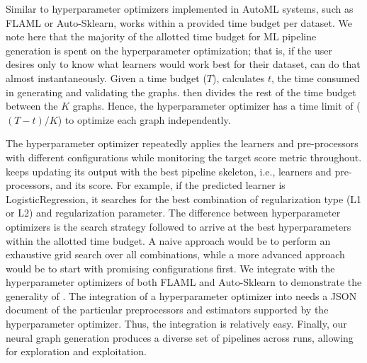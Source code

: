 Similar to hyperparameter optimizers implemented in AutoML systems, such as FLAML or Auto-Sklearn, {\sysname} works within a provided time budget per dataset. We note here that the majority of the allotted time budget for ML pipeline generation is spent on the hyperparameter optimization; that is, if the user desires only to know what learners would work best for their dataset, {\sysname} can do that almost instantaneously. Given a time budget ($T$), {\sysname} calculates $t$, the time consumed in generating and validating the graphs. {\sysname} then divides the rest of the time budget between the $K$ graphs. Hence, the hyperparameter optimizer has a time limit of ($(T-t) / K$) to optimize each graph independently.   

The hyperparameter optimizer repeatedly applies the learners and pre-processors with different configurations while monitoring the target score metric throughout. {\sysname}  keeps updating its output with the best pipeline skeleton, i.e.,  learners and pre-processors, and its score.  
For example, if the predicted learner is LogisticRegression, it searches for the best combination of regularization type (L1 or L2) and regularization parameter. The difference between hyperparameter optimizers is the search strategy followed to arrive at the best hyperparameters within the allotted time budget. A naive approach would be to perform an exhaustive grid search over all combinations, while a more advanced approach would be to start with promising configurations first.  
We integrate {\sysname} with the hyperparameter optimizers of both FLAML \cite{flaml} and Auto-Sklearn \cite{autosklearn} to demonstrate the generality of {\sysname}. The integration of a hyperparameter optimizer into {\sysname} needs a JSON document of the particular preprocessors and estimators supported by the hyperparameter optimizer. Thus, the integration is relatively easy. Finally, our neural graph generation produces a diverse set of pipelines across runs, allowing for exploration and exploitation.









